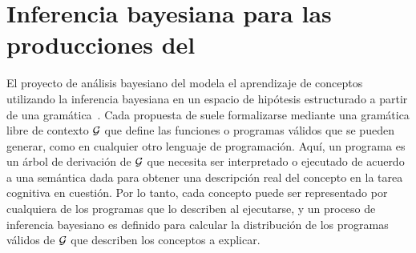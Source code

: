 \section{Inferencia bayesiana para las producciones del \lot}


El proyecto de análisis bayesiano del \lot modela el aprendizaje de conceptos utilizando la inferencia bayesiana en un espacio de hipótesis estructurado a partir de una gramática~\cite{goodman2008rational}. Cada propuesta de \lot suele formalizarse mediante una gramática libre de contexto $\gram$ que define las funciones o programas válidos que se pueden generar, como en cualquier otro lenguaje de programación. Aquí, un programa es un árbol de derivación de $\gram$ que necesita ser interpretado o ejecutado de acuerdo a una semántica dada para obtener una descripción real del concepto en la tarea cognitiva en cuestión. Por lo tanto, cada concepto puede ser representado por cualquiera de los programas que lo describen al ejecutarse, y un proceso de inferencia bayesiano es definido para calcular la distribución de los programas válidos de $\gram$ que describen los conceptos a explicar.


